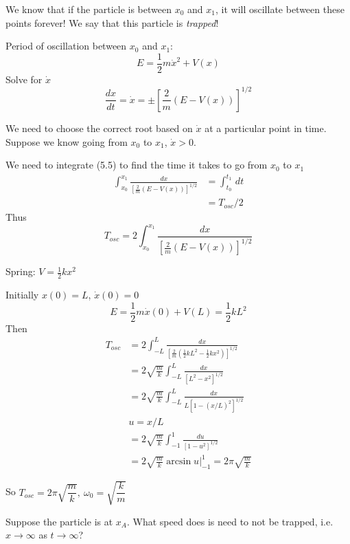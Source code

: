We know that if the particle is between $x_0$ and $x_1$, it will oscillate between these points forever! We say that this particle is \emph{trapped}!

Period of oscillation between $x_0$ and $x_1$:
\[E = \frac{1}{2}m\dot{x}^2 + V(x)\]
Solve for $\dot{x}$
\begin{equation}\frac{dx}{dt} = \dot{x} = \pm\left[\frac{2}{m}(E-V(x))\right]^{1/2}\end{equation}

We need to choose the correct root based on $\dot{x}$ at a particular point in time. Suppose we know going from $x_0$ to $x_1$, $\dot{x} >0$. 

We need to integrate (5.5) to find the time it takes to go from $x_0$ to $x_1$
\[\begin{aligned}\int_{x_0}^{x_1}\frac{dx}{\left[\frac{2}{m}(E-V(x))\right]^{1/2}} &= \int_{t_0}^{t_1} \,dt\\
&= T_{osc}/2	
\end{aligned}
 \]
 Thus
 \begin{equation}
 T_{osc} = 2\int_{x_0}^{x_1}\frac{dx}{\left[\frac{2}{m}(E-V(x))\right]^{1/2}}
\end{equation}
	
\begin{example}[Spring]

Spring: $V = \frac{1}{2}kx^2$
\vspace*{80pt}

Initially $x(0) = L$, $\dot{x}(0) = 0$
\[E = \frac{1}{2}m\dot{x}(0) + V(L) = \frac{1}{2}kL^2\]
Then 
\setlength{\jot}{10pt}
\[\begin{aligned}T_{osc} &= 2\int_{-L}^L \frac{dx}{[\frac{2}{m}(\frac{1}{2}kL^2 - \frac{1}{2}kx^2)]^{1/2}}\\
&= 2\sqrt{\frac{m}{k}} \int_{-L}^{L} \frac{dx}{[L^2-x^2]^{1/2}}\\
&= 2\sqrt{\frac{m}{k}} \int_{-L}^{L} \frac{dx}{L[1-(x/L)^2]^{1/2}}\\
&u = x/L\\
&= 2\sqrt{\frac{m}{k}} \int_{-1}^{1} \frac{du}{[1-u^2]^{1/2}}\\
&= 2\sqrt{\frac{m}{k}}  \arcsin u\bigg|_{-1}^1 =  2\pi \sqrt{\frac{m}{k}} 
\end{aligned}
\]

So $T_{osc} =  2\pi \sqrt{\dfrac{m}{k}},~ \omega_0 = \sqrt{\dfrac{k}{m}}$
	
\end{example}

Suppose the particle is at $x_A$. What speed does is need to not be trapped, i.e. $x\to \infty$ as $t \to \infty$?

